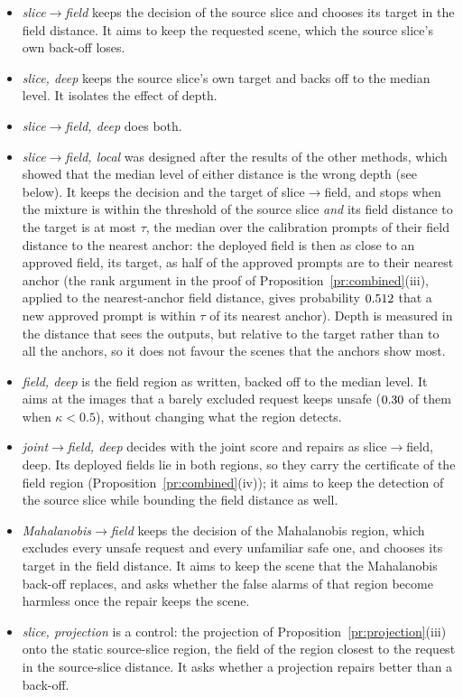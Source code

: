 \documentclass{article}
\theoremstyle{plain}
\theoremstyle{remark}
\begin{document}
\begin{itemize}
\item \emph{slice$\to$field} keeps the decision of the source slice and chooses its target in the field distance. It aims to keep the
requested scene, which the source slice's own back-off loses.
\item \emph{slice, deep} keeps the source slice's own target and backs off to the median level. It isolates the effect of depth.
\item \emph{slice$\to$field, deep} does both.
\item \emph{slice$\to$field, local} was designed after the results of the other methods, which showed that the median level of
either distance is the wrong depth (see below). It keeps the decision and the target of slice$\to$field, and stops when the mixture
is within the threshold of the source slice \emph{and} its field distance to the target is at most $\tau$, the median over the
calibration prompts of their field distance to the nearest anchor: the deployed field is then as close to an approved field, its
target, as half of the approved prompts are to their nearest anchor (the rank argument in the proof of
Proposition~\ref{pr:combined}(iii), applied to the nearest-anchor field distance, gives probability $0.512$ that a new approved
prompt is within $\tau$ of its nearest anchor). Depth is measured in the distance that sees the outputs, but
relative to the target rather than to all the anchors, so it does not favour the scenes that the anchors show most.
\item \emph{field, deep} is the field region as written, backed off to the median level. It aims at the images that a barely
excluded request keeps unsafe ($0.30$ of them when $\kappa<0.5$), without changing what the region detects.
\item \emph{joint$\to$field, deep} decides with the joint score and repairs as slice$\to$field, deep. Its deployed fields lie in both
regions, so they carry the certificate of the field region (Proposition~\ref{pr:combined}(iv)); it aims to keep the detection of
the source slice while bounding the field distance as well.
\item \emph{Mahalanobis$\to$field} keeps the decision of the Mahalanobis region, which excludes every unsafe request and every
unfamiliar safe one, and chooses its target in the field distance. It aims to keep the scene that the Mahalanobis back-off replaces,
and asks whether the false alarms of that region become harmless once the repair keeps the scene.
\item \emph{slice, projection} is a control: the projection of Proposition~\ref{pr:projection}(iii) onto the static source-slice
region, the field of the region closest to the request in the source-slice distance. It asks whether a projection repairs better
than a back-off.
\end{itemize}
\end{document}
